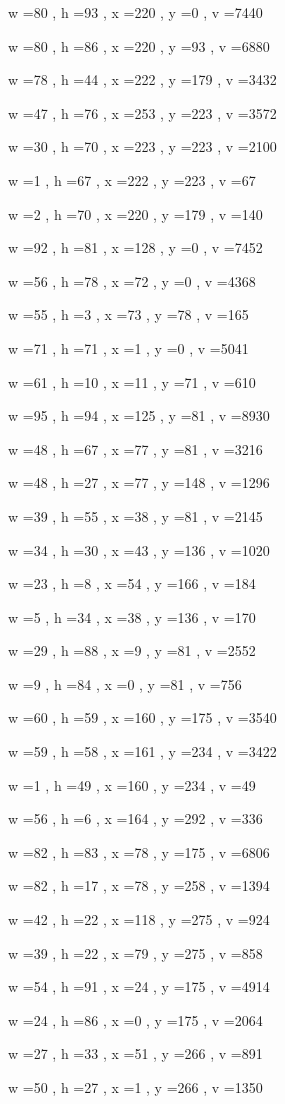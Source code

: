 \documentclass[11pt]{article}
\begin{document}
w =80 , h =93 , x =220 , y =0 , v =7440
\par
w =80 , h =86 , x =220 , y =93 , v =6880
\par
w =78 , h =44 , x =222 , y =179 , v =3432
\par
w =47 , h =76 , x =253 , y =223 , v =3572
\par
w =30 , h =70 , x =223 , y =223 , v =2100
\par
w =1 , h =67 , x =222 , y =223 , v =67
\par
w =2 , h =70 , x =220 , y =179 , v =140
\par
w =92 , h =81 , x =128 , y =0 , v =7452
\par
w =56 , h =78 , x =72 , y =0 , v =4368
\par
w =55 , h =3 , x =73 , y =78 , v =165
\par
w =71 , h =71 , x =1 , y =0 , v =5041
\par
w =61 , h =10 , x =11 , y =71 , v =610
\par
w =95 , h =94 , x =125 , y =81 , v =8930
\par
w =48 , h =67 , x =77 , y =81 , v =3216
\par
w =48 , h =27 , x =77 , y =148 , v =1296
\par
w =39 , h =55 , x =38 , y =81 , v =2145
\par
w =34 , h =30 , x =43 , y =136 , v =1020
\par
w =23 , h =8 , x =54 , y =166 , v =184
\par
w =5 , h =34 , x =38 , y =136 , v =170
\par
w =29 , h =88 , x =9 , y =81 , v =2552
\par
w =9 , h =84 , x =0 , y =81 , v =756
\par
w =60 , h =59 , x =160 , y =175 , v =3540
\par
w =59 , h =58 , x =161 , y =234 , v =3422
\par
w =1 , h =49 , x =160 , y =234 , v =49
\par
w =56 , h =6 , x =164 , y =292 , v =336
\par
w =82 , h =83 , x =78 , y =175 , v =6806
\par
w =82 , h =17 , x =78 , y =258 , v =1394
\par
w =42 , h =22 , x =118 , y =275 , v =924
\par
w =39 , h =22 , x =79 , y =275 , v =858
\par
w =54 , h =91 , x =24 , y =175 , v =4914
\par
w =24 , h =86 , x =0 , y =175 , v =2064
\par
w =27 , h =33 , x =51 , y =266 , v =891
\par
w =50 , h =27 , x =1 , y =266 , v =1350
\par
\newpage
\end{document}
